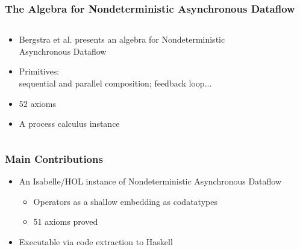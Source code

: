 \documentclass[fleqn,aspectratio=169,10pt]{beamer}
\begin{document}
\begin{frame}[fragile]
  \frametitle{The Algebra for Nondeterministic Asynchronous Dataflow}
  \begin{columns}
    \begin{column}{.6\textwidth}
      \begin{itemize}
        \item Bergstra et al. presents an algebra for Nondeterministic Asynchronous Dataflow
        \item Primitives:\\
              sequential and parallel composition; feedback loop...
        \item 52 axioms
        \item A process calculus instance
      \end{itemize}
    \end{column}
    \begin{column}{.4\textwidth}
      \begin{figure}
        \centering
      \end{figure}
    \end{column}
  \end{columns}
\end{frame}

\begin{frame}[fragile]
  \frametitle{Main Contributions}
  \begin{itemize}
    \item An Isabelle/HOL instance of Nondeterministic Asynchronous Dataflow
          \begin{itemize}
            \item Operators as a shallow embedding as codatatypes
            \item 51 axioms proved
          \end{itemize}
    \item Executable via code extraction to Haskell
  \end{itemize}
\end{frame}
\end{document}
